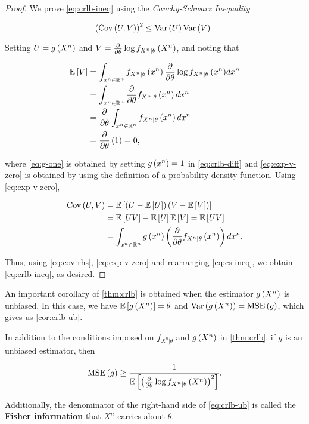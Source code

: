 \documentclass[twoside]{article}
\begin{document}
\begin{proof}
  We prove \eqref{eq:crlb-ineq} using the \emph{Cauchy-Schwarz Inequality}

  \begin{equation}
    \left(\mathrm{Cov}\left(U,V\right)\right)^2 \le \mathrm{Var}\left(U\right)\mathrm{Var}\left(V\right).
    \label{eq:cs-ineq}
  \end{equation}

  Setting \(U=g\left(X^n\right)\) and
  \(V=\frac{\partial}{\partial \theta}\log{f_{X^n|\theta}\ensuremath{\left(X^n\right)}}\), and noting that

  \begin{align}
    \mathbb{E}\left[ V \right] &= \int_{x^n\in\mathbb R^n}f_{X^n|\theta}\left(x^n\right)\frac{\partial}{\partial \theta}\log{f_{X^n|\theta}\ensuremath{\left(x^n\right)}}dx^n \\
             &= \int_{x^n\in\mathbb R^n}\frac{\partial}{\partial \theta}f_{X^n|\theta}\left(x^n\right)dx^n \label{eq:g-one} \\
             &= \frac{\partial}{\partial \theta}\int_{x^n\in\mathbb R^n}f_{X^n|\theta}\left(x^n\right)dx^n \\
             &= \frac{\partial}{\partial \theta}\left(1\right) = 0,
    \label{eq:exp-v-zero}
  \end{align}

  where \eqref{eq:g-one} is obtained by setting \(g\left(x^n\right) = 1\) in
  \eqref{eq:crlb-diff} and \eqref{eq:exp-v-zero} is obtained by using the
  definition of a probability density function. Using \eqref{eq:exp-v-zero},

  \begin{align}
    \mathrm{Cov}\left(U,V\right) &= \mathbb{E}\left[ \left(U-\mathbb{E}\left[ U \right]\right)\left(V-\mathbb{E}\left[ V \right]\right) \right] \\
                   &= \mathbb{E}\left[ UV \right]-\mathbb{E}\left[ U \right]\mathbb{E}\left[ V \right] = \mathbb{E}\left[ UV \right] \\
                   &= \int_{x^n\in\mathbb R^n}g\left(x^n\right)\left(\frac{\partial}{\partial \theta}f_{X^n|\theta}\left(x^n\right)\right)dx^n.
    \label{eq:cov-rhs}
  \end{align}

  Thus, using \eqref{eq:cov-rhs}, \eqref{eq:exp-v-zero} and rearranging
  \eqref{eq:cs-ineq}, we obtain \eqref{eq:crlb-ineq}, as desired.
\end{proof}

An important corollary of \autoref{thm:crlb} is obtained when the estimator
\(g\left(X^n\right)\) is unbiased. In this case, we have \(\mathbb{E}\left[ g\left(X^n\right) \right] =
\theta\) and \(\mathrm{Var}\left(g\left(X^n\right)\right) = \mathrm{MSE}\left(g\right)\), which gives us
\autoref{cor:crlb-ub}.

\begin{corollary}
  \label{cor:crlb-ub}
  In addition to the conditions imposed on \(f_{X^n|\theta}\) and
  \(g\left(X^n\right)\) in \autoref{thm:crlb}, if \(g\) is an unbiased estimator, then
  
  \begin{equation}
    \mathrm{MSE}\left(g\right) \ge \frac{1}{\mathbb{E}\left[ \left(\frac{\partial}{\partial \theta}\log{f_{X^n|\theta}\ensuremath{\left(X^n\right)}}\right)^2 \right]}.
    \label{eq:crlb-ub}
  \end{equation}

  Additionally, the denominator of the right-hand side of \eqref{eq:crlb-ub} is
  called the \textbf{Fisher information} that \(X^n\) carries about \(\theta\).
\end{corollary}
\end{document}
